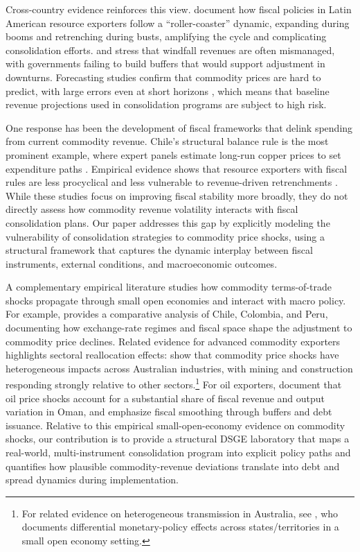 \documentclass[12pt]{article}
\begin{document}
Cross-country evidence reinforces this view. \citet{VillafuerteLopez-MurphyOssowski13} document how fiscal policies in Latin American resource exporters follow a ``roller-coaster'' dynamic, expanding during booms and retrenching during busts, amplifying the cycle and complicating consolidation efforts. \citet{vanPloegVenables2011} and \citet{Venables16} stress that windfall revenues are often mismanaged, with governments failing to build buffers that would support adjustment in downturns. Forecasting studies confirm that commodity prices are hard to predict, with large errors even at short horizons \citep[see][]{BaumeisterKilian2016}, which means that baseline revenue projections used in consolidation programs are subject to high risk.

One response has been the development of fiscal frameworks that delink spending from current commodity revenue. Chile’s structural balance rule is the most prominent example, where expert panels estimate long-run copper prices to set expenditure paths \citep[see][]{Frankel2011}. Empirical evidence shows that resource exporters with fiscal rules are less procyclical and less vulnerable to revenue-driven retrenchments \citep[see][]{Bova2014,Eyraud2018}. While these studies focus on improving fiscal stability more broadly, they do not directly assess how commodity revenue volatility interacts with fiscal consolidation plans. Our paper addresses this gap by explicitly modeling the vulnerability of consolidation strategies to commodity price shocks, using a structural framework that captures the dynamic interplay between fiscal instruments, external conditions, and macroeconomic outcomes.

A complementary empirical literature studies how commodity terms-of-trade shocks propagate through small open economies and interact with macro policy. For example, \citet{Roch17} provides a comparative analysis of Chile, Colombia, and Peru, documenting how exchange-rate regimes and fiscal space shape the adjustment to commodity price declines. Related evidence for advanced commodity exporters highlights sectoral reallocation effects: \citet{KnopVespignani14} show that commodity price shocks have heterogeneous impacts across Australian industries, with mining and construction responding strongly relative to other sectors.\footnote{For related evidence on heterogeneous transmission in Australia, see \citet{Vespignani15}, who documents differential monetary-policy effects across states/territories in a small open economy setting.} For oil exporters, \citet{AlJabrietal22} document that oil price shocks account for a substantial share of fiscal revenue and output variation in Oman, and emphasize fiscal smoothing through buffers and debt issuance. Relative to this empirical small-open-economy evidence on commodity shocks, our contribution is to provide a structural DSGE laboratory that maps a real-world, multi-instrument consolidation program into explicit policy paths and quantifies how plausible commodity-revenue deviations translate into debt and spread dynamics during implementation.
\end{document}
